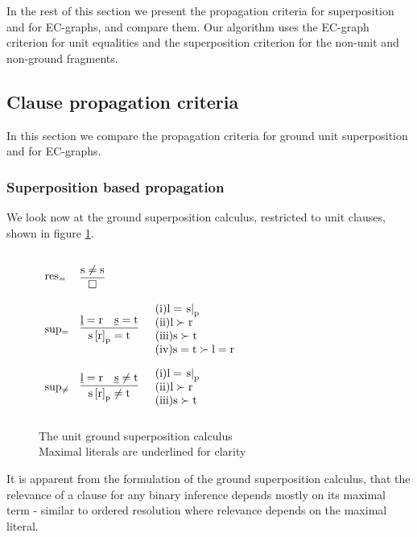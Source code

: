 In the rest of this section we present the propagation criteria for superposition and for EC-graphs, and compare them.
Our algorithm uses the EC-graph criterion for unit equalities and the superposition criterion for the non-unit and non-ground fragments.

\subsection{Clause propagation criteria}
In this section we compare the propagation criteria for ground unit superposition and for EC-graphs.

\subsubsection*{Superposition based propagation}\label{section:superposition_based_propagation}
We look now at the ground superposition calculus, restricted to unit clauses, shown in figure \ref{gusp_calculus}.

\begin{figure}
$
\begin{array}[c]{llll}
\mathrm{res_{=}} &\vcenter{\infer[]{\m{\emptyClause       }                               }{\m{s\neq s}                   }} & 
\parbox[c][1.5cm]{5cm}{}
\\
\mathrm{sup_{=}} &\vcenter{\infer[]{\m{\termRepAt{s}{r}{p} =    t}}{\m{\underline{l}=r} & \m{\underline{s} =    t}}} & 
\parbox[c][1.8cm]{5cm}{
	\m{\sci{1}l = \termAt{s}{p}}\\
	\m{\sci{2}l \succ r}\\
	\m{\sci{3}s \succ t}\\
	\m{\sci{4}s=t \succ l=r}}\\
\mathrm{sup_{\neq}} &\vcenter{\infer[]{\m{\termRepAt{s}{r}{p} \neq t}}{\m{\underline{l}=r} & \m{\underline{s} \neq t}}} & 
\parbox[c][1.8cm]{5cm}{
	\m{\sci{1}l = \termAt{s}{p}}\\
	\m{\sci{2}l \succ r}\\
	\m{\sci{3}s \succ t}}\\
\end{array}
$
\caption{The unit ground superposition calculus \SPU\\
Maximal literals are underlined for clarity}
\label{gusp_calculus}
\end{figure}

It is apparent from the formulation of the ground superposition calculus, that the relevance of a clause for any binary inference depends mostly on its maximal term - similar to ordered resolution where relevance depends on the maximal literal.

